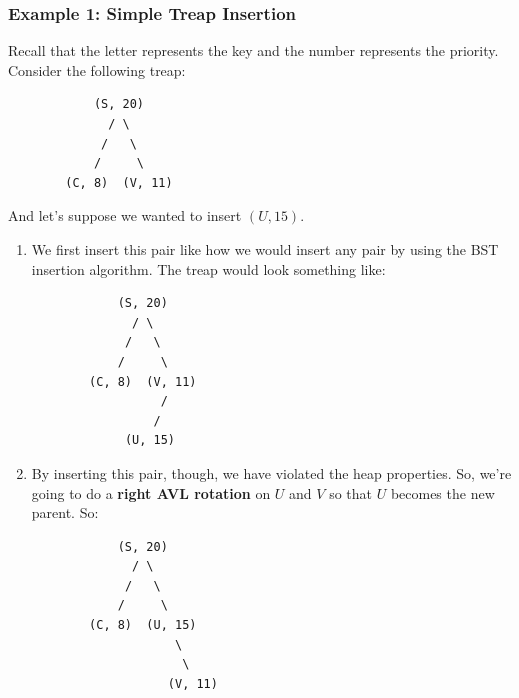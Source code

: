 \documentclass[letterpaper]{article}
\begin{document}
\subsubsection{Example 1: Simple Treap Insertion}
Recall that the letter represents the key and the number represents the priority. Consider the following treap: 
\begin{verbatim}
            (S, 20)
              / \ 
             /   \
            /     \ 
        (C, 8)  (V, 11)
\end{verbatim}
And let's suppose we wanted to insert $(U, 15)$. 
\begin{enumerate}[(1)]
    \item We first insert this pair like how we would insert any pair by using the BST insertion algorithm. The treap would look something like: 
    \begin{verbatim}
            (S, 20)
              / \ 
             /   \
            /     \ 
        (C, 8)  (V, 11)
                  / 
                 /
             (U, 15)
    \end{verbatim}
    
    \item By inserting this pair, though, we have violated the heap properties. So, we're going to do a \textbf{right AVL rotation} on $U$ and $V$ so that $U$ becomes the new parent. So: 
        \begin{verbatim}
            (S, 20)
              / \ 
             /   \
            /     \ 
        (C, 8)  (U, 15)
                    \  
                     \
                   (V, 11)
    \end{verbatim}
\end{enumerate}
\end{document}
